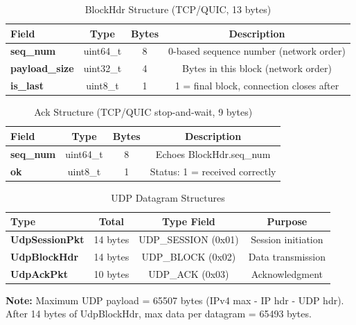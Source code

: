 \documentclass[12pt,a4paper]{article}
\begin{document}
\begin{table}[H]
\centering
\caption{BlockHdr Structure (TCP/QUIC, 13 bytes)}
\begin{tabular}{|l|c|c|c|}
\hline
\textbf{Field} & \textbf{Type} & \textbf{Bytes} & \textbf{Description} \\
\hline
\textbf{seq\_num} & uint64\_t & 8 & 0-based sequence number (network order) \\
\textbf{payload\_size} & uint32\_t & 4 & Bytes in this block (network order) \\
\textbf{is\_last} & uint8\_t & 1 & 1 = final block, connection closes after \\
\hline
\end{tabular}
\end{table}

\begin{table}[H]
\centering
\caption{Ack Structure (TCP/QUIC stop-and-wait, 9 bytes)}
\begin{tabular}{|l|c|c|c|}
\hline
\textbf{Field} & \textbf{Type} & \textbf{Bytes} & \textbf{Description} \\
\hline
\textbf{seq\_num} & uint64\_t & 8 & Echoes BlockHdr.seq\_num \\
\textbf{ok} & uint8\_t & 1 & Status: 1 = received correctly \\
\hline
\end{tabular}
\end{table}

\begin{table}[H]
\centering
\caption{UDP Datagram Structures}
\begin{tabular}{|l|c|c|c|}
\hline
\textbf{Type} & \textbf{Total} & \textbf{Type Field} & \textbf{Purpose} \\
\hline
\textbf{UdpSessionPkt} & 14 bytes & UDP\_SESSION (0x01) & Session initiation \\
\textbf{UdpBlockHdr} & 14 bytes & UDP\_BLOCK (0x02) & Data transmission \\
\textbf{UdpAckPkt} & 10 bytes & UDP\_ACK (0x03) & Acknowledgment \\
\hline
\end{tabular}

\vspace{0.5em}
{\small \textbf{Note:} Maximum UDP payload = 65507 bytes (IPv4 max - IP hdr - UDP hdr).
After 14 bytes of UdpBlockHdr, max data per datagram = 65493 bytes.}
\end{table}

\end{document}
